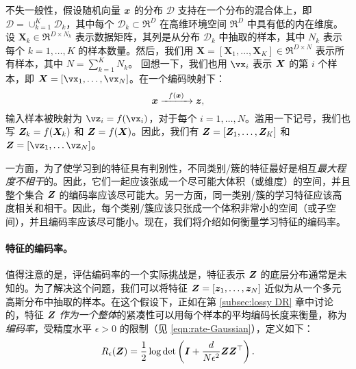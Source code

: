 \documentclass[../../book-main.tex]{subfiles}
\begin{document}

不失一般性，假设随机向量 $\bm{x}$ 的分布 $\mathcal D$ 支持在一个分布的混合体上，即 $\mathcal D = \cup_{k=1}^K \mathcal{D}_k$，其中每个 $\mathcal{D}_k \subset \Re^D$ 在高维环境空间 $\Re^D$ 中具有低的内在维度。设 $\bm X_k \in \Re^{D\times N_k}$ 表示数据矩阵，其列是从分布 $\mathcal{D}_k$ 中抽取的样本，其中 $N_k$ 表示每个 $k=1,\dots,K$ 的样本数量。然后，我们用 $\bm X=[\bm X_1,\dots,\bm X_K] \in \Re^{D\times N}$ 表示所有样本，其中 $N=\sum_{k=1}^K N_k$。
回想一下，我们也用 $\vx_i$ 表示 $\bm{X}$ 的第 $i$ 个样本，即 $\X=[\vx_1,\dots,\vx_N]$。在一个编码映射下：
\begin{equation}
	\bm{x}   \xrightarrow{\hspace{2mm} f(\bm{x})\hspace{2mm}} \bm{z},
\end{equation}
输入样本被映射为 $\vz_i = f(\vx_i)$，对于每个 $i=1,\dots,N$。滥用一下记号，我们也写 $\bm{Z}_k = f(\bm{X}_k)$ 和 $\bm{Z} = f(\bm{X})$。因此，我们有 $\bm{Z} = [\bm Z_1,\dots,\bm Z_K]$ 和 $\Z = [\vz_1,\dots\vz_N]$。

一方面，为了使学习到的特征具有判别性，不同类别/簇的特征最好是相互{\em 最大程度不相干}的。因此，它们一起应该张成一个尽可能大体积（或维度）的空间，并且整个集合 $\bm{Z}$ 的编码率应该尽可能大。另一方面，同一类别/簇的学习特征应该高度相关和相干。因此，每个类别/簇应该只张成一个体积非常小的空间（或子空间），并且编码率应该尽可能小。现在，我们将介绍如何衡量学习特征的编码率。

\paragraph{特征的编码率。} 值得注意的是，评估编码率的一个实际挑战是，特征表示 $\bm{Z}$ 的底层分布通常是未知的。为了解决这个问题，我们可以将特征 $\bm{Z} = [\bm{z}_1, \ldots, \bm{z}_N]$ 近似为从一个多元高斯分布中抽取的样本。在这个假设下，正如在第 \ref{subsec:lossy DR} 章中讨论的，特征 $\bm{Z}$ {\em 作为一个整体}的紧凑性可以用每个样本的平均编码长度来衡量，称为{\em 编码率}，受精度水平 $\epsilon > 0$ 的限制（见 \eqref{eqn:rate-Gaussian}），定义如下：
\begin{equation}
	R_{\epsilon}(\bm{Z}) = \frac{1}{2}\log\det\left(\bm{I} + \frac{d}{N\epsilon^{2}}\bm{Z}\bm{Z}^{\top}\right).
	\label{chap4-eqn:coding-length-eval}
\end{equation}
\end{document}
